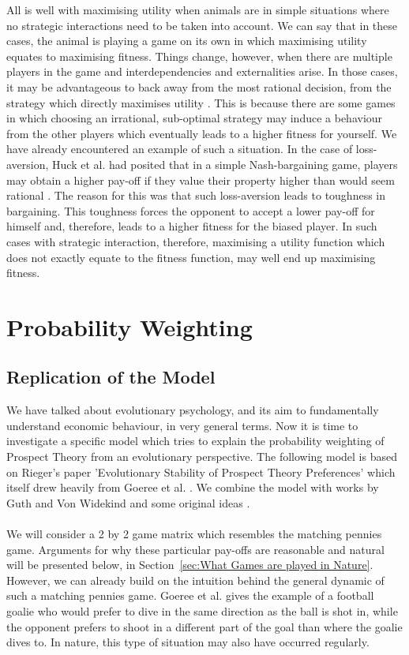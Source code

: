 \documentclass[a4paper,10pt]{article}
\numberwithin{equation}{section}
\begin{document}
All is well with maximising utility when animals are in simple situations where no strategic interactions need to be taken into account. We can say that in these cases, the animal is playing a game on its own in which maximising utility equates to maximising fitness. Things change, however, when there are multiple players in the game and interdependencies and externalities arise. In those cases, it may be advantageous to back away from the most rational decision, from the strategy which directly maximises utility \cite{Frank1988}. This is because there are some games in which choosing an irrational, sub-optimal strategy may induce a behaviour from the other players which eventually leads to a higher fitness for yourself. We have already encountered an example of such a situation. In the case of loss-aversion, Huck et al. had posited that in a simple Nash-bargaining game, players may obtain a higher pay-off if they value their property higher than would seem rational \cite{Huck2005}. The reason for this was that such loss-aversion leads to toughness in bargaining. This toughness forces the opponent to accept a lower pay-off for himself and, therefore, leads to a higher fitness for the biased player. In such cases with strategic interaction, therefore, maximising a utility function which does not exactly equate to the fitness function, may well end up maximising fitness.


\section{Probability Weighting}
\label{sec:Probability Weighting}
\subsection{Replication of the Model}
\label{sec:Replication of the Model}

We have talked about evolutionary psychology, and its aim to fundamentally understand economic behaviour, in very general terms. Now it is time to investigate a specific model which tries to explain the probability weighting of Prospect Theory from an evolutionary perspective. The following model is based on Rieger's paper 'Evolutionary Stability of Prospect Theory Preferences' which itself drew heavily from Goeree et al. \cite{Rieger2009, Goeree2003}. We combine the model with works by Guth and Von Widekind and some original ideas \cite{Guth1992, Guth1995, Widekind2008}.\\
\\
We will consider a 2 by 2 game matrix which resembles the matching pennies game. Arguments for why these particular pay-offs are reasonable and natural will be presented below, in Section~\ref{sec:What Games are played in Nature}. However, we can already build on the intuition behind the general dynamic of such a matching pennies game. Goeree et al. gives the example of a football goalie who would prefer to dive in the same direction as the ball is shot in, while the opponent prefers to shoot in a different part of the goal than where the goalie dives to. In nature, this type of situation may also have occurred regularly.
\end{document}
